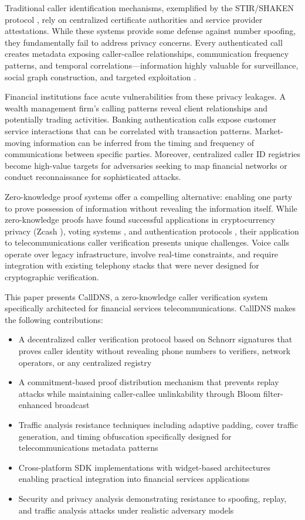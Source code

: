 \documentclass[11pt,twocolumn]{article}
\begin{document}
Traditional caller identification mechanisms, exemplified by the STIR/SHAKEN protocol \cite{stirshaken2020}, rely on centralized certificate authorities and service provider attestations. While these systems provide some defense against number spoofing, they fundamentally fail to address privacy concerns. Every authenticated call creates metadata exposing caller-callee relationships, communication frequency patterns, and temporal correlations—information highly valuable for surveillance, social graph construction, and targeted exploitation \cite{mayer2016}.

Financial institutions face acute vulnerabilities from these privacy leakages. A wealth management firm's calling patterns reveal client relationships and potentially trading activities. Banking authentication calls expose customer service interactions that can be correlated with transaction patterns. Market-moving information can be inferred from the timing and frequency of communications between specific parties. Moreover, centralized caller ID registries become high-value targets for adversaries seeking to map financial networks or conduct reconnaissance for sophisticated attacks.

Zero-knowledge proof systems \cite{goldwasser1989} offer a compelling alternative: enabling one party to prove possession of information without revealing the information itself. While zero-knowledge proofs have found successful applications in cryptocurrency privacy (Zcash \cite{sasson2014}), voting systems \cite{adida2008}, and authentication protocols \cite{feige1988}, their application to telecommunications caller verification presents unique challenges. Voice calls operate over legacy infrastructure, involve real-time constraints, and require integration with existing telephony stacks that were never designed for cryptographic verification.

This paper presents CallDNS, a zero-knowledge caller verification system specifically architected for financial services telecommunications. CallDNS makes the following contributions:

\begin{itemize}
\item A decentralized caller verification protocol based on Schnorr signatures that proves caller identity without revealing phone numbers to verifiers, network operators, or any centralized registry
\item A commitment-based proof distribution mechanism that prevents replay attacks while maintaining caller-callee unlinkability through Bloom filter-enhanced broadcast
\item Traffic analysis resistance techniques including adaptive padding, cover traffic generation, and timing obfuscation specifically designed for telecommunications metadata patterns
\item Cross-platform SDK implementations with widget-based architectures enabling practical integration into financial services applications
\item Security and privacy analysis demonstrating resistance to spoofing, replay, and traffic analysis attacks under realistic adversary models
\end{itemize}
\end{document}
